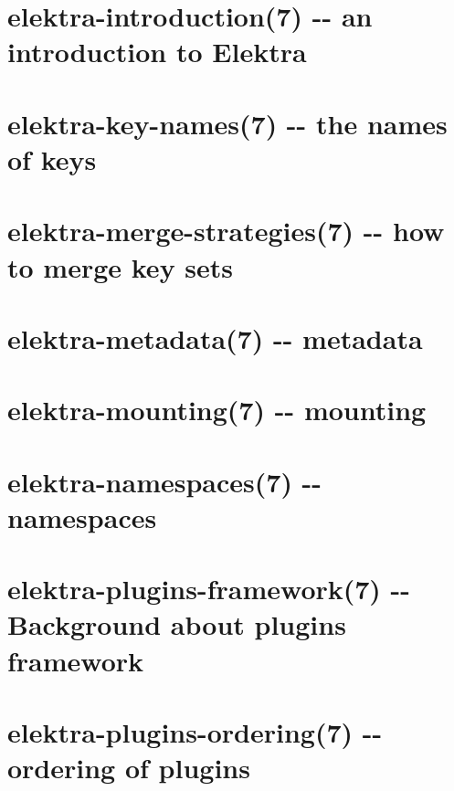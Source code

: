 \documentclass[twoside]{book}
\newcommand{\+}{\discretionary{\mbox{\scriptsize$\hookleftarrow$}}{}{}}
\begin{document}
\chapter{elektra-\/introduction(7) -\/-\/ an introduction to Elektra}
\label{md_doc_help_elektra-introduction}
\hypertarget{md_doc_help_elektra-introduction}{}

\chapter{elektra-\/key-\/names(7) -\/-\/ the names of keys}
\label{md_doc_help_elektra-key-names}
\hypertarget{md_doc_help_elektra-key-names}{}

\chapter{elektra-\/merge-\/strategies(7) -\/-\/ how to merge key sets}
\label{md_doc_help_elektra-merge-strategy}
\hypertarget{md_doc_help_elektra-merge-strategy}{}

\chapter{elektra-\/metadata(7) -\/-\/ metadata}
\label{md_doc_help_elektra-metadata}
\hypertarget{md_doc_help_elektra-metadata}{}

\chapter{elektra-\/mounting(7) -\/-\/ mounting}
\label{md_doc_help_elektra-mounting}
\hypertarget{md_doc_help_elektra-mounting}{}

\chapter{elektra-\/namespaces(7) -\/-\/ namespaces}
\label{md_doc_help_elektra-namespaces}
\hypertarget{md_doc_help_elektra-namespaces}{}

\chapter{elektra-\/plugins-\/framework(7) -\/-\/ Background about plugins framework}
\label{md_doc_help_elektra-plugins-framework}
\hypertarget{md_doc_help_elektra-plugins-framework}{}

\chapter{elektra-\/plugins-\/ordering(7) -\/-\/ ordering of plugins}
\label{md_doc_help_elektra-plugins-ordering}
\hypertarget{md_doc_help_elektra-plugins-ordering}{}

\end{document}
